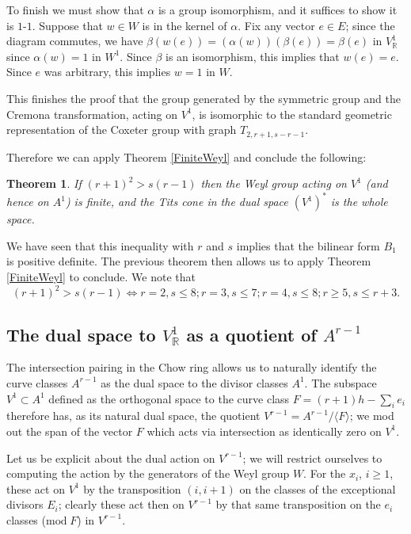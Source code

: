 \documentclass[12pt]{article}
\numberwithin{equation}{section}
\newtheorem{theorem}[equation]{Theorem}
\numberwithin{equation}{section}
\numberwithin{subeq}{equation}
\def\bbR{\mathbb{R}}
\def\mod{\text{mod}\;}
\begin{document}
To finish we must show that $\alpha$ is a group isomorphism, and it suffices to show it is $1$-$1$.
Suppose that $w \in W$ is in the kernel of $\alpha$.
Fix any vector $e \in E$;
since the diagram commutes, we have $\beta(w(e)) = (\alpha(w))(\beta(e)) = \beta(e)$ in $V^1_\bbR$
since $\alpha(w) = 1$ in $W^1$.
Since $\beta$ is an isomorphism, this implies that $w(e) = e$.
Since $e$ was arbitrary, this implies $w=1$ in $W$.


This finishes the proof that the group generated by the symmetric group and the Cremona transformation,
acting on $V^1$,
is isomorphic to the standard geometric representation of the Coxeter group with graph $T_{2,r+1,s-r-1}$.

Therefore we can apply Theorem \ref{FiniteWeyl} and conclude the following:

\begin{theorem}
If $(r+1)^2 > s(r-1)$ then the Weyl group acting on $V^1$ (and hence on $A^1$) is finite,
and the Tits cone in the dual space $(V^1)^*$ is the whole space.
\end{theorem}

\medskip{}
We have seen that this inequality with $r$ and $s$ implies that the bilinear form $B_1$ is positive definite.
The previous theorem then allows us to apply Theorem \ref{FiniteWeyl} to conclude.
We note that
\begin{equation}\label{finiteWeylrs}
(r+1)^2 > s(r-1) \iff r=2, s \leq 8; r=3, s \leq 7; r=4, s \leq 8; r\geq 5, s \leq r+3.
\end{equation}

\subsection{The dual space to $V^1_\bbR$ as a quotient of $A^{r-1}$}

The intersection pairing in the Chow ring allows us to naturally identify the curve classes $A^{r-1}$
as the dual space to the divisor classes $A^1$.
The subspace $V^1\subset A^1$ defined as the orthogonal space to the curve class
$F = (r+1)h - \sum_i e_i$
therefore has, as its natural dual space,
the quotient $V^{r-1} = A^{r-1}/\langle F \rangle$;
we mod out the span of the vector $F$
which acts via intersection as identically zero on $V^1$.

Let us be explicit about the dual action on $V^{r-1}$;
we will restrict ourselves to computing the action by the generators of the Weyl group $W$.
For the $x_i$, $i \geq 1$, these act on $V^1$ by the transposition $(i,i+1)$ on the classes of the exceptional divisors $E_i$;  clearly these act then on $V^{r-1}$ by that same transposition on the $e_i$ classes ($\mod F$) in $V^{r-1}$.
\end{document}
